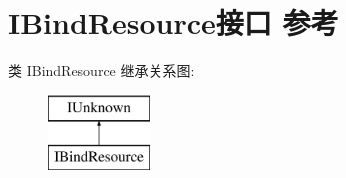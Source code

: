 \hypertarget{interface_i_bind_resource}{}\section{I\+Bind\+Resource接口 参考}
\label{interface_i_bind_resource}
类 I\+Bind\+Resource 继承关系图\+:\begin{figure}[H]
\begin{center}
\leavevmode
\includegraphics[height=2.000000cm]{interface_i_bind_resource}
\end{center}
\end{figure}
